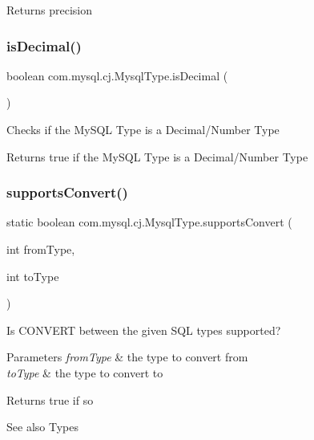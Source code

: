 \begin{DoxyReturn}{Returns}
precision 
\end{DoxyReturn}
\mbox{\label{enumcom_1_1mysql_1_1cj_1_1_mysql_type_a212a8ea526160a1c989bc45f00946131}} 
\subsubsection{\texorpdfstring{is\+Decimal()}{isDecimal()}}
{\footnotesize\ttfamily boolean com.\+mysql.\+cj.\+Mysql\+Type.\+is\+Decimal (\begin{DoxyParamCaption}{ }\end{DoxyParamCaption})}

Checks if the My\+S\+QL Type is a Decimal/\+Number Type

\begin{DoxyReturn}{Returns}
true if the My\+S\+QL Type is a Decimal/\+Number Type 
\end{DoxyReturn}
\mbox{\label{enumcom_1_1mysql_1_1cj_1_1_mysql_type_a4b4c2fc4727e3e28c653e6cdfb2eaed5}} 
\subsubsection{\texorpdfstring{supports\+Convert()}{supportsConvert()}}
{\footnotesize\ttfamily static boolean com.\+mysql.\+cj.\+Mysql\+Type.\+supports\+Convert (\begin{DoxyParamCaption}\item[{int}]{from\+Type,  }\item[{int}]{to\+Type }\end{DoxyParamCaption})\hspace{0.3cm}{\ttfamily [static]}}

Is C\+O\+N\+V\+E\+RT between the given S\+QL types supported?


\begin{DoxyParams}{Parameters}
{\em from\+Type} & the type to convert from \\
\hline
{\em to\+Type} & the type to convert to \\
\hline
\end{DoxyParams}
\begin{DoxyReturn}{Returns}
true if so 
\end{DoxyReturn}
\begin{DoxySeeAlso}{See also}
Types 
\end{DoxySeeAlso}



